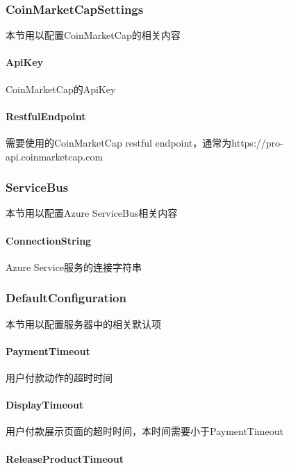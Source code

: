 \documentclass[a4paper,11pt]{article}
\theoremstyle{definition}
\begin{document}
\subsubsection{CoinMarketCapSettings}
本节用以配置CoinMarketCap的相关内容

\paragraph{ApiKey}


CoinMarketCap的ApiKey

\paragraph{RestfulEndpoint}


需要使用的CoinMarketCap restful endpoint，通常为https://pro-api.coinmarketcap.com

\subsubsection{ServiceBus}

本节用以配置Azure ServiceBus相关内容

\paragraph{ConnectionString}


Azure Service服务的连接字符串

\subsubsection{DefaultConfiguration}
本节用以配置服务器中的相关默认项

\paragraph{PaymentTimeout}


用户付款动作的超时时间

\paragraph{DisplayTimeout}


用户付款展示页面的超时时间，本时间需要小于PaymentTimeout

\paragraph{ReleaseProductTimeout}
\end{document}
